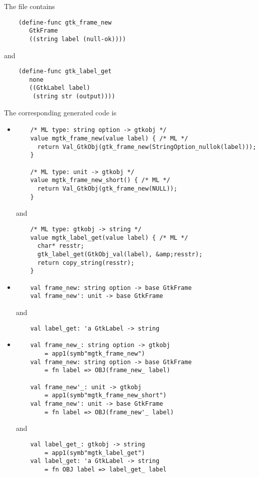 \documentclass{article}
\begin{document}
The  file contains
\begin{verbatim}
    (define-func gtk_frame_new
       GtkFrame
       ((string label (null-ok))))
\end{verbatim}
and
\begin{verbatim}
    (define-func gtk_label_get
       none
       ((GtkLabel label)
        (string str (output))))
\end{verbatim}

The corresponding generated code is
\begin{itemize}
\item {}
\begin{verbatim}
    /* ML type: string option -> gtkobj */
    value mgtk_frame_new(value label) { /* ML */
      return Val_GtkObj(gtk_frame_new(StringOption_nullok(label)));
    }

    /* ML type: unit -> gtkobj */
    value mgtk_frame_new_short() { /* ML */
      return Val_GtkObj(gtk_frame_new(NULL));
    }
\end{verbatim}
and
\begin{verbatim}
    /* ML type: gtkobj -> string */
    value mgtk_label_get(value label) { /* ML */
      char* resstr;
      gtk_label_get(GtkObj_val(label), &amp;resstr);
      return copy_string(resstr);
    }
\end{verbatim}

\item {}
\begin{verbatim}
    val frame_new: string option -> base GtkFrame
    val frame_new': unit -> base GtkFrame
\end{verbatim}
and
\begin{verbatim}
    val label_get: 'a GtkLabel -> string
\end{verbatim}

\item {}
\begin{verbatim}
    val frame_new_: string option -> gtkobj
        = app1(symb"mgtk_frame_new")
    val frame_new: string option -> base GtkFrame
        = fn label => OBJ(frame_new_ label)

    val frame_new'_: unit -> gtkobj
        = app1(symb"mgtk_frame_new_short")
    val frame_new': unit -> base GtkFrame
        = fn label => OBJ(frame_new'_ label)
\end{verbatim}
and
\begin{verbatim}
    val label_get_: gtkobj -> string
        = app1(symb"mgtk_label_get")
    val label_get: 'a GtkLabel -> string
        = fn OBJ label => label_get_ label
\end{verbatim}

\end{itemize}
\end{document}
